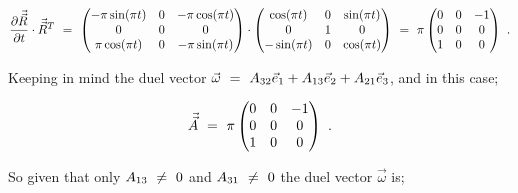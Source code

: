 \documentclass{article}
\begin{document}
\begin{equation} \label{eq:1}
\frac{\partial{\vec{\vec{R}}}}{\partial{t}} \cdot \vec{\vec{R}}^{T} \hspace{0.125cm} = \hspace{0.125cm} \begin{pmatrix} - \pi \sin ( \pi t ) & 0 & - \pi \cos ( \pi t ) \\ 0 & 0 & 0 \\ \pi \cos ( \pi t ) & 0 & - \pi \sin ( \pi t ) \end{pmatrix} \cdot \begin{pmatrix} \cos ( \pi t ) & 0 & \sin ( \pi t ) \\ 0 & 1 & 0 \\ - \sin ( \pi t ) & 0 & \cos ( \pi t ) \end{pmatrix} \hspace{0.125cm} =  \hspace{0.125cm} \pi \begin{pmatrix} 0 & 0 & -1 \\ 0 & 0 & 0 \\ 1 & 0 & 0 \end{pmatrix}  \hspace{0.125cm} .
\end{equation} 

Keeping in mind the duel vector \begin{math} \vec{\omega} \hspace{0.125cm} =  \hspace{0.125cm} A_{32} \vec{e}_1 + A_{13} \vec{e}_2 + A_{21} \vec{e}_3 \end{math}, and in this case;

\begin{equation} \label{eq:1}
\vec{\vec{A}}  \hspace{0.125cm} = \hspace{0.125cm} \pi \begin{pmatrix} 0 & 0 & -1 \\ 0 & 0 & 0 \\ 1 & 0 & 0 \end{pmatrix}  \hspace{0.125cm} .
\end{equation} 

\vspace{0.25cm}

So given that only \begin{math} A_{13} \hspace{0.125cm} \neq \hspace{0.125cm} 0 \end{math} and \begin{math} A_{31} \hspace{0.125cm} \neq \hspace{0.125cm} 0 \end{math} the duel vector \begin{math} \vec{\omega} \end{math} is;
\end{document}
